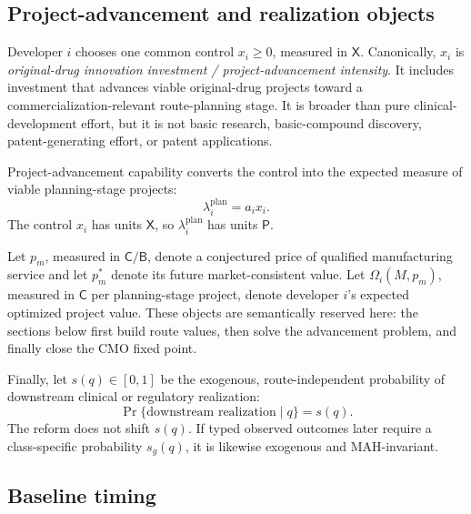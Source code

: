 \subsection{Project-advancement and realization objects}
\label{subsec:p01-advancement-realization}

Developer \(i\) chooses one common control \(x_i\geq0\), measured in
\(\mathsf X\).  Canonically, \(x_i\) is
\emph{original-drug innovation investment / project-advancement intensity}.
It includes investment that advances viable original-drug projects toward a
commercialization-relevant route-planning stage.  It is broader than pure
clinical-development effort, but it is not basic research, basic-compound
discovery, patent-generating effort, or patent applications.

Project-advancement capability converts the control into the expected measure of viable
planning-stage projects:
\begin{equation}
  \lambda_i^{\mathrm{plan}}=a_ix_i.
  \label{eq:p01-planned-intensity}
\end{equation}
The control \(x_i\) has units \(\mathsf X\), so
\(\lambda_i^{\mathrm{plan}}\) has units \(\mathsf P\).

Let \(p_m\), measured in \(\mathsf C/\mathsf B\), denote a conjectured price
of qualified manufacturing service and let \(p_m^*\) denote its future
market-consistent value.  Let \(\Omega_i(M,p_m)\), measured in \(\mathsf C\)
per planning-stage project, denote developer \(i\)'s expected optimized project
value.  These objects are semantically reserved here: the sections below first
build route values, then solve the advancement problem, and finally close the
CMO fixed point.

Finally, let \(s(q)\in[0,1]\) be the exogenous, route-independent probability
of downstream clinical or regulatory realization:
\begin{equation}
  \Pr\{\text{downstream realization}\mid q\}=s(q).
  \label{eq:p01-downstream-probability}
\end{equation}
The reform does not shift \(s(q)\).  If typed observed outcomes later require a
class-specific probability \(s_g(q)\), it is likewise exogenous and
MAH-invariant.

\subsection{Baseline timing}
\label{subsec:p01-timing}

